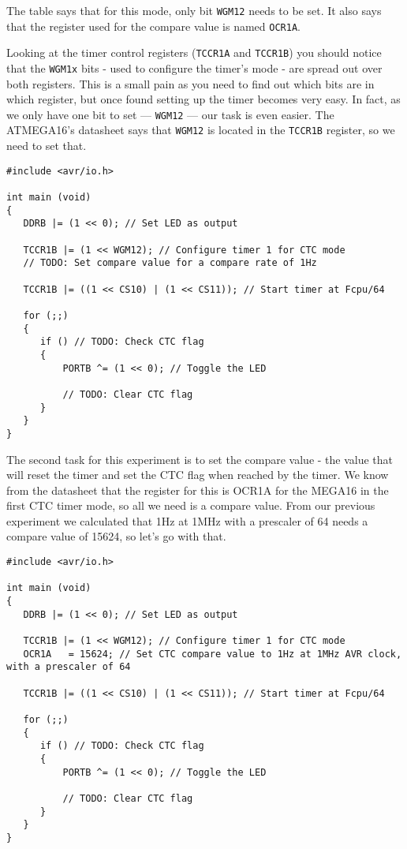 \documentclass[a4paper,oneside,notitlepage]{book}
\begin{document}
The table says that for this mode, only bit \texttt{WGM12} needs to be set. It also says that the register used for the compare value is named \texttt{OCR1A}.

Looking at the timer control registers (\texttt{TCCR1A} and \texttt{TCCR1B}) you should notice that the \texttt{WGM1x} bits - used to configure the timer's mode - are spread out over both registers. This is a small pain as you need to find out which bits are in which register, but once found setting up the timer becomes very easy. In fact, as we only have one bit to set --- \texttt{WGM12} --- our task is even easier. The ATMEGA16's datasheet says that \texttt{WGM12} is located in the \texttt{TCCR1B} register, so we need to set that.

\begin{center}
\begin{lstlisting}
#include <avr/io.h>

int main (void)
{
   DDRB |= (1 << 0); // Set LED as output

   TCCR1B |= (1 << WGM12); // Configure timer 1 for CTC mode
   // TODO: Set compare value for a compare rate of 1Hz

   TCCR1B |= ((1 << CS10) | (1 << CS11)); // Start timer at Fcpu/64

   for (;;)
   {
      if () // TODO: Check CTC flag
      {
          PORTB ^= (1 << 0); // Toggle the LED

          // TODO: Clear CTC flag
      }
   }
}
\end{lstlisting}
\end{center}

The second task for this experiment is to set the compare value - the value that will reset the timer and set the CTC flag when reached by the timer. We know from the datasheet that the register for this is OCR1A for the MEGA16 in the first CTC timer mode, so all we need is a compare value. From our previous experiment we calculated that 1Hz at 1MHz with a prescaler of 64 needs a compare value of 15624, so let's go with that.

\begin{center}
\begin{lstlisting}
#include <avr/io.h>

int main (void)
{
   DDRB |= (1 << 0); // Set LED as output

   TCCR1B |= (1 << WGM12); // Configure timer 1 for CTC mode
   OCR1A   = 15624; // Set CTC compare value to 1Hz at 1MHz AVR clock, with a prescaler of 64

   TCCR1B |= ((1 << CS10) | (1 << CS11)); // Start timer at Fcpu/64

   for (;;)
   {
      if () // TODO: Check CTC flag
      {
          PORTB ^= (1 << 0); // Toggle the LED

          // TODO: Clear CTC flag
      }
   }
}
\end{lstlisting}
\end{center}
\end{document}
